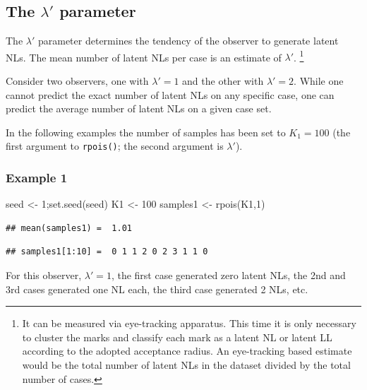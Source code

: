 \documentclass[
]{book}
\newenvironment{Shaded}{\begin{snugshade}}{\end{snugshade}}
\newcommand{\DecValTok}[1]{\textcolor[rgb]{0.00,0.00,0.81}{#1}}
\newcommand{\FunctionTok}[1]{\textcolor[rgb]{0.00,0.00,0.00}{#1}}
\newcommand{\NormalTok}[1]{#1}
\newcommand{\OtherTok}[1]{\textcolor[rgb]{0.56,0.35,0.01}{#1}}
\begin{document}
\hypertarget{rsm-summary-lambda-prime-parameter}{%
\subsection{\texorpdfstring{The \(\lambda'\) parameter}{The \textbackslash lambda' parameter}}\label{rsm-summary-lambda-prime-parameter}}

The \(\lambda'\) parameter determines the tendency of the observer to generate latent NLs. The mean number of latent NLs per case is an estimate of \(\lambda'\). \footnote{It can be measured via eye-tracking apparatus. This time it is only necessary to cluster the marks and classify each mark as a latent NL or latent LL according to the adopted acceptance radius. An eye-tracking based estimate would be the total number of latent NLs in the dataset divided by the total number of cases.}

Consider two observers, one with \(\lambda' = 1\) and the other with \(\lambda' = 2\). While one cannot predict the exact number of latent NLs on any specific case, one can predict the average number of latent NLs on a given case set.

In the following examples the number of samples has been set to \(K_1=100\) (the first argument to \texttt{rpois()}; the second argument is \(\lambda'\)).

\hypertarget{example-1}{%
\subsubsection{Example 1}\label{example-1}}

\begin{Shaded}
\begin{Highlighting}[]
\NormalTok{seed }\OtherTok{\textless{}{-}} \DecValTok{1}\NormalTok{;}\FunctionTok{set.seed}\NormalTok{(seed)}
\NormalTok{K1 }\OtherTok{\textless{}{-}} \DecValTok{100}
\NormalTok{samples1 }\OtherTok{\textless{}{-}} \FunctionTok{rpois}\NormalTok{(K1,}\DecValTok{1}\NormalTok{)}
\end{Highlighting}
\end{Shaded}

\begin{verbatim}
## mean(samples1) =  1.01
\end{verbatim}

\begin{verbatim}
## samples1[1:10] =  0 1 1 2 0 2 3 1 1 0
\end{verbatim}

For this observer, \(\lambda' = 1\), the first case generated zero latent NLs, the 2nd and 3rd cases generated one NL each, the third case generated 2 NLs, etc.
\end{document}
